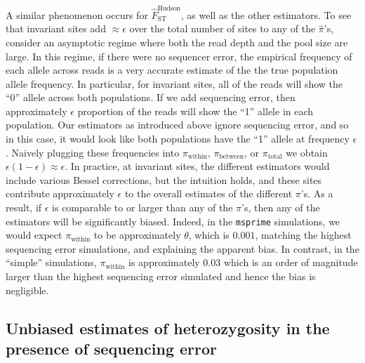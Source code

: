 \documentclass[a4paper,fontsize=9pt,DIV=14]{scrartcl}
\newcounter{todo}
\newcommand\todo[1]{}
\newcommand\toolname{\textsc}
\newcommand{\hudsonestimator}{\widehat{F}_\text{ST}^\text{Hudson}}
\begin{document}
A similar phenomenon occurs for $\hudsonestimator$, as well as the other estimators.  To see that invariant sites add $\approx\epsilon$ over the total number of sites to any of the $\widehat{\pi}$'s, consider an asymptotic regime where both the read depth and the pool size are large.  In this regime, if there were no sequencer error, the empirical frequency of each allele across reads is a very accurate estimate of the the true population allele frequency.  In particular, for invariant sites, all of the reads will show the ``0'' allele across both populations.  If we add sequencing error, then approximately $\epsilon$ proportion of the reads will show the ``1'' allele in each population.  Our estimators as introduced above ignore sequencing error, and so in this case, it would look like both populations have the ``1'' allele at frequency $\epsilon$.  Naively plugging these frequencies into $\pi_\text{within}$, $\pi_\text{between}$, or $\pi_\text{total}$ we obtain $\epsilon(1-\epsilon)\approx \epsilon$.  In practice, at invariant sites, the different estimators would include various Bessel corrections, but the intuition holds, and these sites contribute approximately $\epsilon$ to the overall estimates of the different $\pi$'s.  As a result, if $\epsilon$ is comparable to or larger than any of the $\pi$'s, then any of the  estimators will be significantly biased.  Indeed, in the \texttt{msprime} simulations, we would expect $\pi_\text{within}$ to be approximately $\theta$, which is $0.001$, matching the highest sequencing error simulations, and explaining the apparent bias.  In contrast, in the ``simple'' simulations, $\pi_\text{within}$ is approximately $0.03$ which is an order of magnitude larger than the highest sequencing error simulated and hence the bias is negligible.



\subsection{Unbiased estimates of heterozygosity in the presence of sequencing error}
\label{supp:sec:FST:sub:HeterozygositySequencingError}
\end{document}
